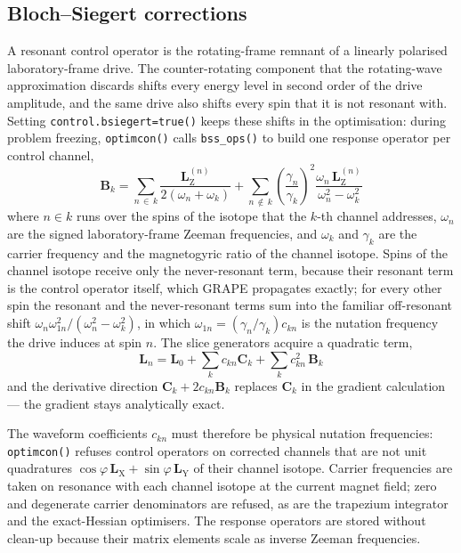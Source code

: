 \documentclass[11pt,a4paper]{article}
\newcommand{\code}[1]{\texttt{#1}}
\begin{document}
\subsection{Bloch--Siegert corrections}
\label{sec:bsiegert}

A resonant control operator is the rotating-frame remnant of a linearly
polarised laboratory-frame drive. The counter-rotating component that
the rotating-wave approximation discards shifts every energy level in
second order of the drive amplitude, and the same drive also shifts
every spin that it is not resonant with. Setting
\code{control.bsiegert=true()} keeps these shifts in the optimisation:
during problem freezing, \code{optimcon()} calls \code{bss\_ops()} to
build one response operator per control channel,
\begin{equation}
  \mathbf{B}_k=\sum_{n\,\in\,k}
  \frac{\mathbf{L}_{\mathrm{Z}}^{(n)}}{2\left(\omega_n+\omega_k\right)}
  +\sum_{n\,\notin\,k}
  \left(\frac{\gamma_n}{\gamma_k}\right)^{2}
  \frac{\omega_n\,\mathbf{L}_{\mathrm{Z}}^{(n)}}
       {\omega_n^{2}-\omega_k^{2}}
\end{equation}
where $n\in k$ runs over the spins of the isotope that the $k$-th
channel addresses, $\omega_n$ are the signed laboratory-frame Zeeman
frequencies, and $\omega_k$ and $\gamma_k$ are the carrier frequency
and the magnetogyric ratio of the channel isotope. Spins of the channel
isotope receive only the never-resonant term, because their resonant
term is the control operator itself, which GRAPE propagates exactly;
for every other spin the resonant and the never-resonant terms sum into
the familiar off-resonant shift
$\omega_n\omega_{1n}^{2}/(\omega_n^{2}-\omega_k^{2})$, in which
$\omega_{1n}=(\gamma_n/\gamma_k)c_{kn}$ is the nutation frequency the
drive induces at spin $n$. The slice generators acquire a quadratic
term,
\begin{equation}
  \mathbf{L}_n=\mathbf{L}_0
  +\sum_k c_{kn}\mathbf{C}_k
  +\sum_k c_{kn}^{2}\,\mathbf{B}_k
\end{equation}
and the derivative direction $\mathbf{C}_k+2c_{kn}\mathbf{B}_k$
replaces $\mathbf{C}_k$ in the gradient calculation --- the gradient
stays analytically exact.

The waveform coefficients $c_{kn}$ must therefore be physical nutation
frequencies: \code{optimcon()} refuses control operators on corrected
channels that are not unit quadratures
$\cos\varphi\,\mathbf{L}_{\mathrm{X}}+\sin\varphi\,\mathbf{L}_{\mathrm{Y}}$
of their channel isotope. Carrier frequencies are taken on resonance
with each channel isotope at the current magnet field; zero and
degenerate carrier denominators are refused, as are the trapezium
integrator and the exact-Hessian optimisers. The response operators are
stored without clean-up because their matrix elements scale as inverse
Zeeman frequencies.
\end{document}
